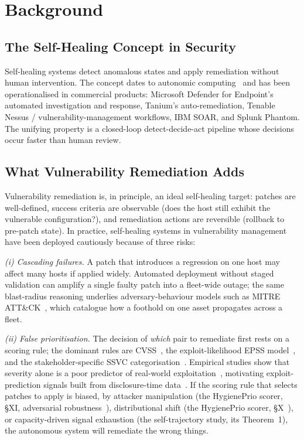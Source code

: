 \section{Background}

\subsection{The Self-Healing Concept in Security}

Self-healing systems detect anomalous states and apply remediation
without human intervention. The concept dates to autonomic
computing~\cite{kephart2003vision} and has been operationalised in
commercial products: Microsoft Defender for Endpoint's automated
investigation and response, Tanium's auto-remediation, Tenable
Nessus / vulnerability-management workflows, IBM SOAR, and Splunk
Phantom. The unifying property
is a closed-loop detect-decide-act pipeline whose decisions occur
faster than human review.

\subsection{What Vulnerability Remediation Adds}

Vulnerability remediation is, in principle, an ideal self-healing
target: patches are well-defined, success criteria are observable
(does the host still exhibit the vulnerable configuration?), and
remediation actions are reversible (rollback to pre-patch state).
In practice, self-healing systems in vulnerability management have
been deployed cautiously because of three risks:

\textit{(i) Cascading failures.} A patch that introduces a regression
on one host may affect many hosts if applied widely. Automated
deployment without staged validation can amplify a single faulty
patch into a fleet-wide outage; the same blast-radius reasoning
underlies adversary-behaviour models such as MITRE
ATT\&CK~\cite{strom2020attack}, which catalogue how a foothold on one
asset propagates across a fleet.

\textit{(ii) False prioritisation.} The decision of \emph{which}
pair to remediate first rests on a scoring rule; the dominant rules
are CVSS~\cite{mell2007cvss}, the exploit-likelihood EPSS
model~\cite{jacobs2021epss}, and the stakeholder-specific SSVC
categorisation~\cite{spring2021ssvc}. Empirical studies show that
severity alone is a poor predictor of real-world
exploitation~\cite{allodi2014comparing}, motivating exploit-prediction
signals built from disclosure-time
data~\cite{sabottke2015vulnerability,bullough2017predicting}.
If the scoring rule that selects
patches to apply is biased, by attacker manipulation
(the HygienePrio scorer, \S XI, adversarial robustness~\cite{paper4hygieneprio}),
distributional shift
(the HygienePrio scorer, \S X~\cite{paper4hygieneprio}), or capacity-driven signal
exhaustion (the self-trajectory study, its Theorem~1), the autonomous system will
remediate the wrong things.

